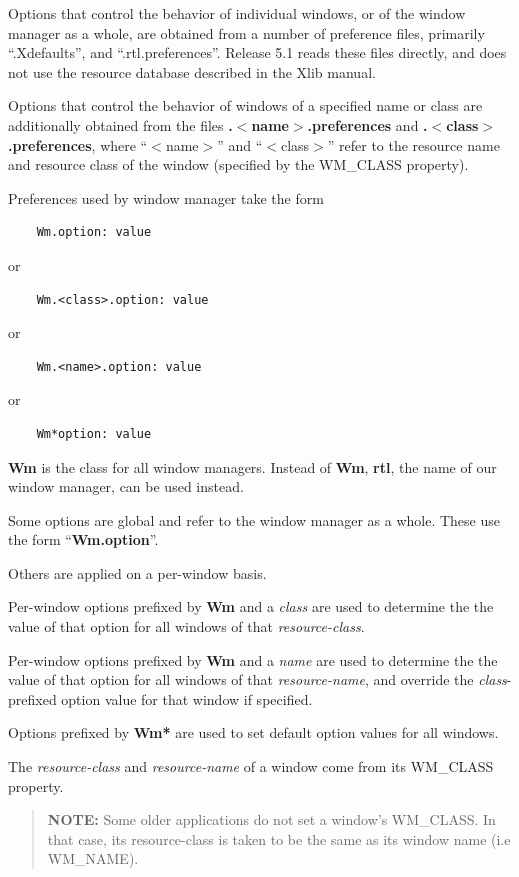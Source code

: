 Options that control the behavior of individual windows, or of the window
manager as a whole, are obtained from a number of preference files,
primarily ``.Xdefaults'', and ``.rtl.preferences''.  Release 5.1 reads
these files directly, and does not use the resource database described in
the Xlib manual.

Options that control the behavior of windows of a specified name or class
are additionally obtained from the files {\bf .$<$name$>$.preferences}
and {\bf .$<$class$>$.preferences}, where ``$<$name$>$'' and ``$<$class$>$'' refer to the
resource name and resource class of the window (specified by the
{\sc WM\_CLASS} property).

Preferences used by window manager take the form
\begin{verbatim}
    Wm.option: value
\end{verbatim}
or
\begin{verbatim}
    Wm.<class>.option: value
\end{verbatim}
or
\begin{verbatim}
    Wm.<name>.option: value
\end{verbatim}
or
\begin{verbatim}
    Wm*option: value
\end{verbatim}

{\bf Wm} is the class for all window managers.  Instead of {\bf Wm}, {\bf rtl},
the name of our window manager, can be used instead.

Some options are global and refer to the window manager as a whole.
These use the form ``{\bf Wm.option}''.

Others are applied on a per-window basis.

Per-window options prefixed by {\bf Wm} and a {\it class}
are used to determine the the value of that option for all windows of
that {\it resource-class}.

Per-window options prefixed by {\bf Wm} and a {\it name} are used to
determine the the value of that option for all windows of that
{\it resource-name}, and override the
{\it class}-prefixed option value for that window if specified.

Options prefixed by {\bf Wm*} are used to set default option values for
all windows.

The {\it resource-class} and {\it resource-name} of a window come from its
{\sc WM\_CLASS} property.

\begin{quotation}
{\bf NOTE:} Some older applications do not set a window's {\sc WM\_CLASS}.
In that case, its resource-class is taken to be the same as its window
name (i.e {\sc WM\_NAME}).
\end{quotation}

